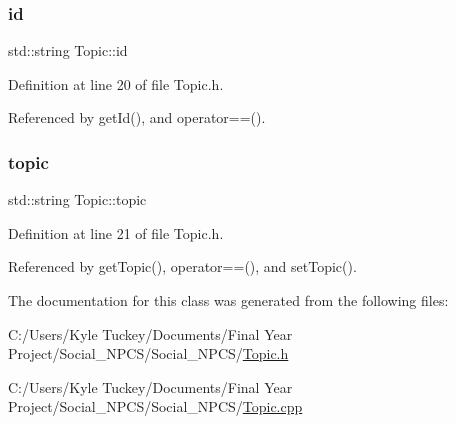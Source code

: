 \mbox{\label{class_topic_a3f0e95d8c647b06bd9a3e257d86e021a}} 
\subsubsection{\texorpdfstring{id}{id}}
{\footnotesize\ttfamily std\+::string Topic\+::id\hspace{0.3cm}{\ttfamily [private]}}



Definition at line 20 of file Topic.\+h.



Referenced by get\+Id(), and operator==().

\mbox{\label{class_topic_ae74abf3428c3d51f0e3c95e995d29633}} 
\subsubsection{\texorpdfstring{topic}{topic}}
{\footnotesize\ttfamily std\+::string Topic\+::topic\hspace{0.3cm}{\ttfamily [private]}}



Definition at line 21 of file Topic.\+h.



Referenced by get\+Topic(), operator==(), and set\+Topic().



The documentation for this class was generated from the following files\+:\begin{DoxyCompactItemize}
\item 
C\+:/\+Users/\+Kyle Tuckey/\+Documents/\+Final Year Project/\+Social\+\_\+\+N\+P\+C\+S/\+Social\+\_\+\+N\+P\+C\+S/\hyperlink{_topic_8h}{Topic.\+h}\item 
C\+:/\+Users/\+Kyle Tuckey/\+Documents/\+Final Year Project/\+Social\+\_\+\+N\+P\+C\+S/\+Social\+\_\+\+N\+P\+C\+S/\hyperlink{_topic_8cpp}{Topic.\+cpp}\end{DoxyCompactItemize}
